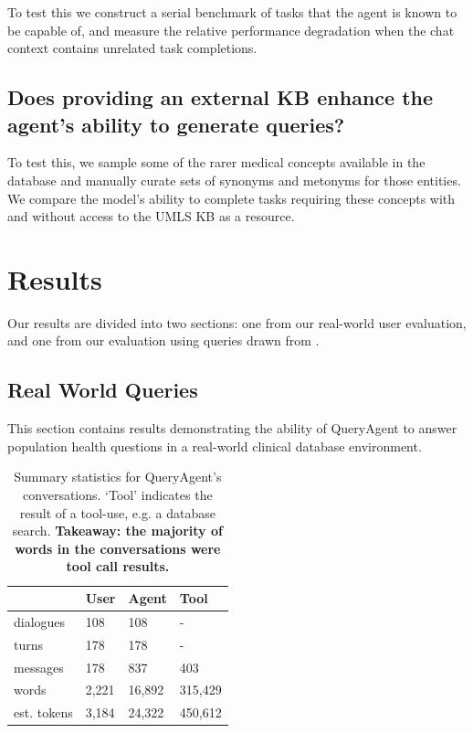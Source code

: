 \documentclass[11pt]{article}
\begin{document}
To test this we construct a serial benchmark of tasks that the agent is known to be capable of, and measure the relative performance degradation when the chat context contains unrelated task completions.

\subsection*{Does providing an external KB enhance the agent's ability to generate queries?}

To test this, we sample some of the rarer medical concepts available in the database and manually curate sets of synonyms and metonyms for those entities.
We compare the model's ability to complete tasks requiring these concepts with and without access to the UMLS KB as a resource.

\section{Results}
Our results are divided into two sections: one from our real-world user evaluation, and one from our evaluation using queries drawn from \citet{ziletti_generating_2025}.

\subsection{Real World Queries}
This section contains results demonstrating the ability of QueryAgent to answer population health questions in a real-world clinical database environment.

\begin{table}[ht]
\centering
\begin{tabular}{|l|l|l|l|}
\hline
	              & User & Agent & Tool \\
\hline
	dialogues	& 108 & 108    & -   \\
	turns       & 178 & 178    & -   \\
    messages	& 178 & 837    & 403   \\
	words 		& 2,221 & 16,892 & 315,429 \\
	est. tokens	& 3,184 & 24,322 & 450,612\\
\hline
\end{tabular}
\caption{
Summary statistics for QueryAgent's conversations.
`Tool' indicates the result of a tool-use, e.g. a database search.
\textbf{Takeaway: the majority of words in the conversations were tool call results.}
}
\label{tab:conversation-statistics}
\end{table}
\end{document}
